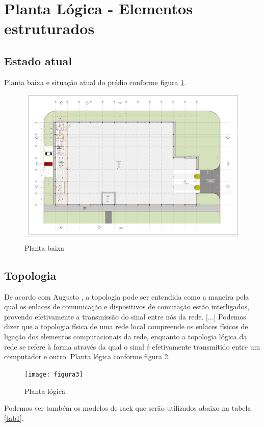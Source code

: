\documentclass[	DIV=calc,%
							paper=a4,%
							fontsize=12pt,%
							onecolumn]{scrartcl}	 					%
\begin{document}
\section{Planta Lógica - Elementos estruturados}

\subsection{Estado atual}
Planta baixa e situação atual do prédio conforme figura \ref{figura2}. 
\begin{figure}
	\centering
	\includegraphics[width=\textwidth]{figura2}
	\caption{Planta baixa}
	\label{figura2}
\end{figure}

\subsection{Topologia}
De acordo com Augusto \cite{ID1}, a topologia pode ser entendida como a maneira pela qual os enlaces de comunicação e dispositivos de comutação estão interligados, provendo efetivamente a transmissão do sinal entre nós da rede. [...] Podemos dizer que a topologia física de uma rede local compreende os enlaces físicos de ligação dos elementos computacionais da rede, enquanto a topologia lógica da rede se refere à forma através da qual o sinal é efetivamente transmitido entre um computador e outro. Planta lógica conforme figura \ref{figura3}. 
\begin{figure}
	\centering
	\texttt{[image: figura3]}
	\caption{Planta lógica}
	\label{figura3}
\end{figure}

Podemos ver também os modelos de rack que serão utilizados abaixo na tabela \ref{tab1}.
\end{document}
